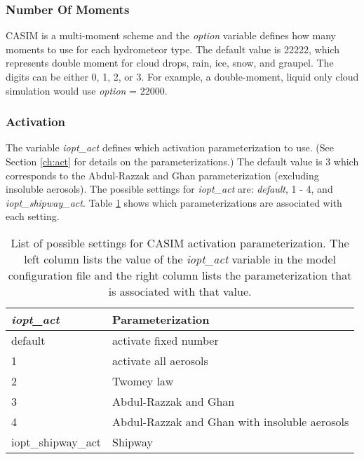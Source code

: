 \subsubsection{Number Of Moments}
CASIM is a multi-moment scheme and the \textit{option} variable defines how many moments to use for each hydrometeor type. The default value is 22222, which represents double moment for cloud drops, rain, ice, snow, and graupel. The digits can be either 0, 1, 2, or 3. For example, a double-moment, liquid only cloud simulation would use \textit{option} = 22000. \citep{casimCode}

\subsubsection{Activation}
The variable \textit{iopt\_act} defines which activation parameterization to use. (See Section \ref{ch:act} for details on the parameterizations.) The default value is 3 which corresponds to the Abdul-Razzak and Ghan parameterization (excluding insoluble aerosols). The possible settings for \textit{iopt\_act} are: \textit{default}, 1 - 4, and \textit{iopt\_shipway\_act}. Table \ref{tab:act} shows which parameterizations are associated with each setting. \citep{casimCode}

\begin{table}[H]
	\centering
	\footnotesize
	\caption{List of possible settings for CASIM activation parameterization. The left column lists the value of the \textit{iopt\_act} variable in the model configuration file and the right column lists the parameterization that is associated with that value.}
	\label{tab:act}
	\begin{tabular}{|l|l|}
		\hline
		\textit{\textbf{iopt\_act}} & \textbf{Parameterization}                     \\ \hline
		default                     & activate fixed number                                  \\ \hline
		1                           & activate all aerosols                                  \\ \hline
		2                           & Twomey law                                    \\ \hline
		3                           & Abdul-Razzak and Ghan                         \\ \hline
		4                           & Abdul-Razzak and Ghan with insoluble aerosols \\ \hline
		iopt\_shipway\_act          & Shipway                                       \\ \hline
	\end{tabular}
\end{table}

